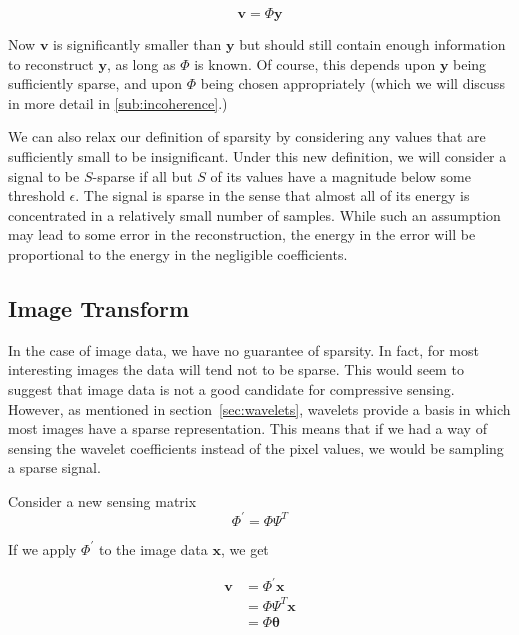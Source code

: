 \documentclass{IEEEtran}
\newcommand{\bfv}{\mathbf{v}}
\newcommand{\bfx}{\mathbf{x}}
\newcommand{\bfy}{\mathbf{y}}
\newcommand{\bftheta}{\mathbf{\theta}}
\begin{document}
\begin{equation}
  \label{eq:sense}
  \bfv = \Phi \bfy
\end{equation}

Now $\bfv$ is significantly smaller than $\bfy$ but should still contain enough information to reconstruct $\bfy$, as long as $\Phi$ is known. Of course, this depends upon $\bfy$ being sufficiently sparse, and upon $\Phi$ being chosen appropriately (which we will discuss in more detail in \ref{sub:incoherence}.)

We can also relax our definition of sparsity by considering any values that are sufficiently small to be insignificant.  Under this new definition, we will consider a signal to be $S$-sparse if all but $S$ of its values have a magnitude below some threshold $\epsilon$.  The signal is sparse in the sense that almost all of its energy is concentrated in a relatively small number of samples.  While such an assumption may lead to some error in the reconstruction, the energy in the error will be proportional to the energy in the negligible coefficients.

\subsection{Image Transform}

In the case of image data, we have no guarantee of sparsity. In fact, for most interesting images the data will tend not to be sparse. This would seem to suggest that image data is not a good candidate for compressive sensing. However, as mentioned in section~\ref{sec:wavelets}, wavelets provide a basis in which most images have a sparse representation.  This means that if we had a way of sensing the wavelet coefficients instead of the pixel values, we would be sampling a sparse signal.

Consider a new sensing matrix
\begin{equation}
  \label{eq:newsense}
  \Phi^\prime = \Phi \Psi^T
\end{equation}

If we apply $\Phi^\prime$ to the image data $\bfx$, we get

\begin{equation}
  \label{eq:newsenseapplied}
  \begin{split}
  \bfv &= \Phi^\prime \bfx \\
  &= \Phi \Psi^T \bfx \\
  &= \Phi \bftheta
  \end{split}
\end{equation}
\end{document}

